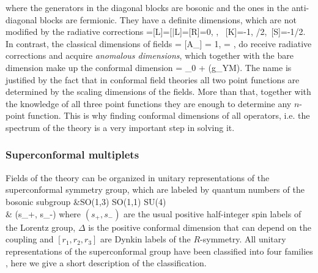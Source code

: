 \)
\eeq
where the generators in the diagonal blocks are bosonic and the ones in the anti-diagonal blocks are fermionic.
They have a definite dimensions, which are not modified by the radiative corrections
\beq
	[D]=[L]=[\bar L]=[R]=0\;, \;, \ [K]=-1\;, /2\;,\  [S]=-1/2\;.
\eeq
In contrast, the classical dimensions of fields
\beq
	[\Phi^I] = [A_\mu] = 1\;, \quad [\psi_a] = ,
\eeq
do receive radiative corrections and acquire \emph{anomalous dimensions}, which together with the bare dimension make up the conformal dimension
\beq
	\Delta = \Delta_0 + \gamma(g_{YM}).
\eeq
The name is justified by the fact that in conformal field theories all two point functions are determined by the scaling dimensions of the fields. 
More than that, together with the knowledge of all three point functions they are enough to determine any $n$-point function. 
This is why finding conformal dimensions of all operators, i.e. the spectrum of the theory is a very important step in solving it.

\subsubsection{Superconformal multiplets}

Fields of the theory can be organized in unitary representations of the superconformal symmetry group, which are labeled by quantum numbers of the bosonic subgroup
\beqa
	&SO(1,3) \times SO(1,1) \times SU(4) \nonumber \\
	&\quad \; (s_+, s_-) \quad \quad \Delta \quad \quad  [r_1, r_2, r_3]
\eeqa 
where $(s_+, s_-)$ are the usual positive half-integer spin labels of the Lorentz group, $\Delta$ is the positive conformal dimension that can depend on the coupling and $[r_1, r_2, r_3]$ are Dynkin labels of the $R$-symmetry.
All unitary representations of the superconformal group have been classified into four families \cite{Dobrev:1985ab,Dobrev:1985cd}, here we give a short description of the classification.
  
